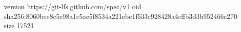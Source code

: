 version https://git-lfs.github.com/spec/v1
oid sha256:8060bce8c5e98a1c5ac5f8534a221ebc1f533c928428a4cffb3d3b952466e270
size 17521
